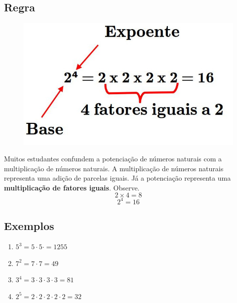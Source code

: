 \documentclass{article}
\begin{document}
\subsection{Regra}
\begin{figure}[htbp]
    \centering
    \includegraphics[scale=0.4]{potenciacao2.jpg}
 
    \label{fig:my_label}
\end{figure}
Muitos estudantes confundem a potenciação de números naturais com a multiplicação de números naturais. A multiplicação de números naturais representa uma adição de parcelas iguais. Já a potenciação representa uma \textbf{multiplicação de fatores iguais}. Observe. 
\begin{equation}
  2 \times 4 = 8  
\end{equation}
\begin{equation}
    2^4 = 16
\end{equation}
\subsection{Exemplos}
\begin{enumerate}
    \item $5^3 = 5 \cdot 5 \cdot = 125 5$
    \item $7^2 = 7 \cdot 7 = 49 $
    \item $3^4 =3 \cdot 3 \cdot 3 \cdot 3 = 81$
    \item $2^5 = 2 \cdot 2 \cdot 2 \cdot 2 \cdot 2 = 32$
\end{enumerate}
\end{document}
